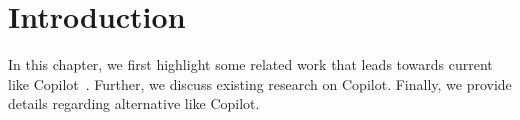 \label{chapter:background}

\newlength{\savedunitlength}
\setlength{\unitlength}{2em}

\section{Introduction}
In this chapter, we first highlight some related work that leads towards current \cct{} like Copilot~\cite{Copilot-web}. Further, we discuss existing research on Copilot. Finally, we provide details regarding alternative \cct{} like Copilot.






\setlength{\unitlength}{\savedunitlength}
